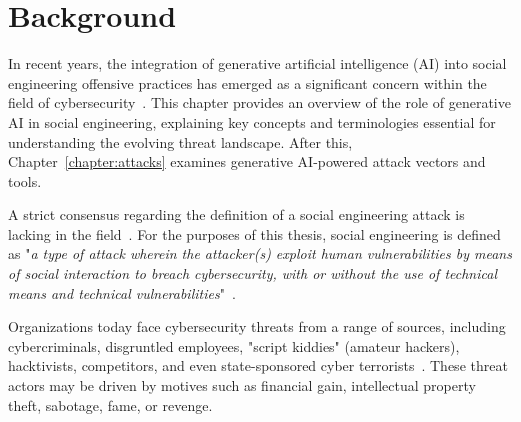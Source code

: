 


\chapter{Background\label{chapter:background}}
\begin{comment}

From study materials:
    - "Konteksti ja käsitteet, haasteet ja arviointikriteerit, arvot, tutkimuskysymysten analyysi"
    - Context and terminology (käsitteet), challenges and measurement criteria, values, research question analysis
    - Tarkentaa tavoiteet ja osakysymykset, vertailukriteerit (jotka jäsentävät muita lukuja)


\end{comment}



%
%
In recent years, the integration of generative artificial intelligence (AI) into social engineering offensive practices has emerged as a significant concern within the field of cybersecurity~\citep{blauth_AI_Crime_Overview_Malicious_Use_Abuse_2022, king_AI_Crime_Interdisciplinary_Analysis_2019, mirsky_Threat_Offensive_AI_Organizations_2023}. This chapter provides an overview of the role of generative AI in social engineering, explaining key concepts and terminologies essential for understanding the evolving threat landscape. After this, Chapter~\ref{chapter:attacks} examines generative AI-powered attack vectors and tools.





%
%
A strict consensus regarding the definition of a social engineering attack is lacking in the field~\citep{hatfield_SE_Evolution_Concept_2018}. For the purposes of this thesis, social engineering is defined as "\textit{a type of attack wherein the attacker(s) exploit human vulnerabilities by means of social interaction to breach cybersecurity, with or without the use of technical means and technical vulnerabilities}"~\citep{wang_Defining_Social_Engineering_2020}.








%
%
Organizations today face cybersecurity threats from a range of sources, including cybercriminals, disgruntled employees, "script kiddies" (amateur hackers), hacktivists, competitors, and even state-sponsored cyber terrorists~\citep{mirsky_Threat_Offensive_AI_Organizations_2023}. These threat actors may be driven by motives such as financial gain, intellectual property theft, sabotage, fame, or revenge.

